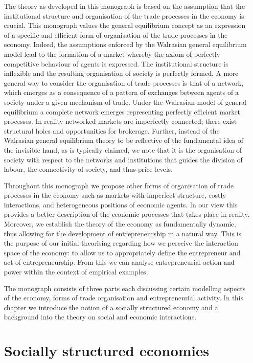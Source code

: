 The theory as developed in this monograph is based on the assumption that the institutional structure and organisation of the trade processes in the economy is crucial. This monograph values the general equilibrium concept as an expression of a specific and efficient form of organisation of the trade processes in the economy. Indeed, the assumptions enforced by the Walrasian general equilibrium model lead to the formation of a market whereby the axiom of perfectly competitive behaviour of agents is expressed. The institutional structure is inflexible and the resulting organisation of society is perfectly formed. A more general way to consider the organisation of trade processes is that of a network, which emerges as a consequence of a pattern of exchanges between agents of a society under a given mechanism of trade. Under the Walrasian model of general equilibrium a complete network emerges representing perfectly efficient market processes. In reality networked markets are imperfectly connected; there exist structural holes and opportunities for brokerage. Further, instead of the Walrasian general equilibrium theory to be reflective of the fundamental idea of the invisible hand, as is typically claimed, we note that it is the organisation of society with respect to the networks and institutions that guides the division of labour, the connectivity of society, and thus price levels.

Throughout this monograph we propose other forms of organisation of trade processes in the economy such as markets with imperfect structure, costly interactions, and heterogeneous positions of economic agents. In our view this provides a better description of the economic processes that takes place in reality. Moreover, we establish the theory of the economy as fundamentally dynamic, thus allowing for the development of entrepreneurship in a natural way. This is the purpose of our initial theorising regarding how we perceive the interaction space of the economy: to allow us to appropriately define the entrepreneur and act of entrepreneurship. From this we can analyse entrepreneurial action and power within the context of empirical examples.

The monograph consists of three parts each discussing certain modelling aspects of the economy, forms of trade organisation and entrepreneurial activity. In this chapter we introduce the notion of a socially structured economy and a background into the theory on social and economic interactions.

\section{Socially structured economies}

